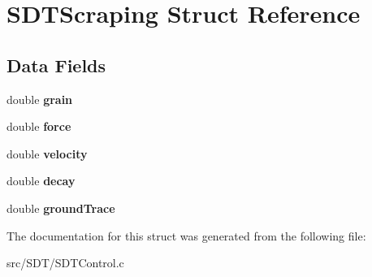 \hypertarget{struct_s_d_t_scraping}{}\section{S\+D\+T\+Scraping Struct Reference}
\label{struct_s_d_t_scraping}
\subsection*{Data Fields}
\begin{DoxyCompactItemize}
\item 
\hypertarget{struct_s_d_t_scraping_a70338fcaf3537644825b356846dc7de8}{}double {\bfseries grain}\label{struct_s_d_t_scraping_a70338fcaf3537644825b356846dc7de8}

\item 
\hypertarget{struct_s_d_t_scraping_aab6099c236e628500314462a9b259d66}{}double {\bfseries force}\label{struct_s_d_t_scraping_aab6099c236e628500314462a9b259d66}

\item 
\hypertarget{struct_s_d_t_scraping_accacf4e9263030d70ed79f8516c0eac5}{}double {\bfseries velocity}\label{struct_s_d_t_scraping_accacf4e9263030d70ed79f8516c0eac5}

\item 
\hypertarget{struct_s_d_t_scraping_ab01a33c3f845cc963c97a17973b4e871}{}double {\bfseries decay}\label{struct_s_d_t_scraping_ab01a33c3f845cc963c97a17973b4e871}

\item 
\hypertarget{struct_s_d_t_scraping_aa403a364bd1d278300db9c2c176e8498}{}double {\bfseries ground\+Trace}\label{struct_s_d_t_scraping_aa403a364bd1d278300db9c2c176e8498}

\end{DoxyCompactItemize}


The documentation for this struct was generated from the following file\+:\begin{DoxyCompactItemize}
\item 
src/\+S\+D\+T/S\+D\+T\+Control.\+c\end{DoxyCompactItemize}
